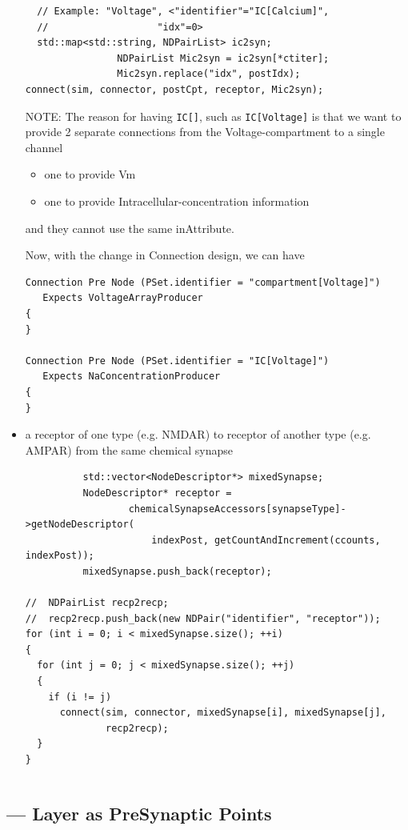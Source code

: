 \begin{itemize}
\begin{verbatim}
  // Example: "Voltage", <"identifier"="IC[Calcium]",
  //                   "idx"=0>
  std::map<std::string, NDPairList> ic2syn;
                NDPairList Mic2syn = ic2syn[*ctiter];
                Mic2syn.replace("idx", postIdx);
connect(sim, connector, postCpt, receptor, Mic2syn);

\end{verbatim}  

NOTE: The reason for having \verb!IC[]!, such as 
\verb!IC[Voltage]! is that we want to provide 2 separate connections from the
Voltage-compartment to a single channel
\begin{itemize}
  \item one to provide Vm
  \item one to provide Intracellular-concentration information
\end{itemize}
and they cannot use the same inAttribute.

Now, with the change in Connection design, we can have
\begin{verbatim}
Connection Pre Node (PSet.identifier = "compartment[Voltage]") 
   Expects VoltageArrayProducer
{
}

Connection Pre Node (PSet.identifier = "IC[Voltage]") 
   Expects NaConcentrationProducer
{
}

\end{verbatim}

  \item a receptor of one type (e.g. NMDAR) to receptor of another type (e.g.
  AMPAR) from the same chemical synapse
\begin{verbatim}
          std::vector<NodeDescriptor*> mixedSynapse;
          NodeDescriptor* receptor =
                  chemicalSynapseAccessors[synapseType]->getNodeDescriptor(
                      indexPost, getCountAndIncrement(ccounts, indexPost));
          mixedSynapse.push_back(receptor);

//  NDPairList recp2recp;
//  recp2recp.push_back(new NDPair("identifier", "receptor"));
for (int i = 0; i < mixedSynapse.size(); ++i)
{
  for (int j = 0; j < mixedSynapse.size(); ++j)
  {
    if (i != j)
      connect(sim, connector, mixedSynapse[i], mixedSynapse[j],
              recp2recp);
  }
}
\end{verbatim}
\end{itemize} 
\begin{verbatim}

\end{verbatim}

\subsection{--- Layer as PreSynaptic Points}
\label{sec:Layer-as-PreSynapticPoint}

